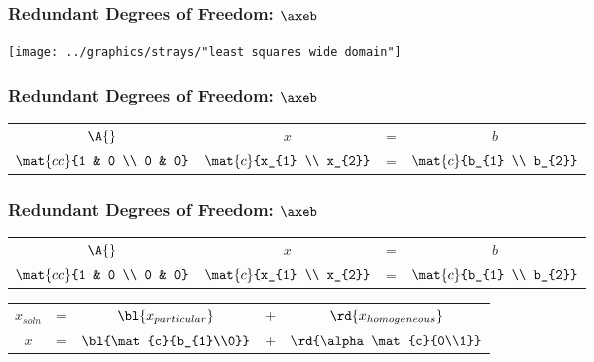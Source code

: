 \documentclass[]{beamer}
\begin{document}
\begin{frame}
  \frametitle{Redundant Degrees of Freedom: $\axeb$}  %
  \begin{center}
    \texttt{[image: ../graphics/strays/"least squares wide domain"]}
  \end{center}
\end{frame}

\begin{frame}
  \frametitle{Redundant Degrees of Freedom: $\axeb$}  %
  \begin{table}[htdp]
    \begin{center}
      \begin{tabular}{cccc}
        $\A{}$ & $x$ & = & $b$ \\[5pt]
        $\mat{cc}{1 & 0 \\ 0 & 0}$ & $\mat{c}{x_{1} \\ x_{2}}$ & = & $\mat{c}{b_{1} \\ b_{2}}$
      \end{tabular}
    \end{center}
  \end{table}%
\end{frame}

\begin{frame}
  \frametitle{Redundant Degrees of Freedom: $\axeb$}  %
  \begin{table}[htdp]
    \begin{center}
      \begin{tabular}{cccc}
        $\A{}$ & $x$ & = & $b$ \\[5pt]
        $\mat{cc}{1 & 0 \\ 0 & 0}$ & $\mat{c}{x_{1} \\ x_{2}}$ & = & $\mat{c}{b_{1} \\ b_{2}}$
      \end{tabular}
    \end{center}
  \end{table}%
  \begin{table}[htdp]
    \begin{center}
      \begin{tabular}{ccccc}
        $x_{soln}$ & = & $\bl{x_{particular}}$ & + & $\rd{x_{homogeneous}}$ \\[5pt]
        $x$ & = & $\bl{\mat{c}{b_{1}\\0}}$ & + & $\rd{\alpha \mat{c}{0\\1}}$
      \end{tabular}
    \end{center}
  \end{table}%
\end{frame}
\end{document}
